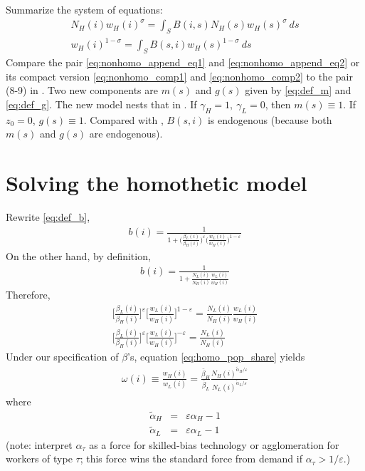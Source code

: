 \documentclass{article}
\begin{document}
Summarize the system of equations:
\begin{eqnarray}
    \label{eq:nonhomo_comp1}
	N_H(i) w_H(i)^{\sigma}  = \int_S B(i,s) N_H(s) w_H(s)^{\sigma}~ds \\
    \label{eq:nonhomo_comp2}
 	w_H(i)^{1-\sigma} = \int_S B(s,i) w_H(s)^{1-\sigma} ~ ds 
\end{eqnarray} 
Compare the pair \eqref{eq:nonhomo_append_eq1} and \eqref{eq:nonhomo_append_eq2} or its compact version \eqref{eq:nonhomo_comp1} and \eqref{eq:nonhomo_comp2} to the pair (8-9) in \citet{allen2014trade}. Two new components are $m(s)$ and $g(s)$ given by \eqref{eq:def_m} and \eqref{eq:def_g}. The new model nests that in \citet{allen2014trade}. If $\gamma_H=1,~\gamma_L=0$, then $m(s)\equiv 1$. If $z_0=0$, $g(s)\equiv 1$.  Compared with \citet{allen2014trade}, $B(s,i)$ is endogenous (because both $m(s)$ and $g(s)$ are endogenous). 

\section{Solving the homothetic model}

Rewrite \eqref{eq:def_b},
\begin{eqnarray}
	b(i) = \frac{1}{1 + \Big(\frac{\beta_L(i)}{\beta_H(i)}\Big)^{\varepsilon} \Big(\frac{w_L(i)}{w_H(i)}\Big)^{1-\varepsilon}} \nonumber
\end{eqnarray}
On the other hand, by definition,
\begin{eqnarray}
	b(i) = \frac{1}{1 + \frac{N_L(i)}{N_H(i)} \frac{w_L(i)}{w_H(i)}} \nonumber
\end{eqnarray}
Therefore,
\begin{eqnarray}
	\Big[\frac{\beta_L(i)}{\beta_H(i)}\Big]^{\varepsilon} \Big[\frac{w_L(i)}{w_H(i)}\Big]^{1-\varepsilon} = \frac{N_L(i)}{N_H(i)} \frac{w_L(i)}{w_H(i)} \nonumber \\
    \label{eq:homo_pop_share}
	\Big[\frac{\beta_L(i)}{\beta_H(i)}\Big]^{\varepsilon} \Big[\frac{w_L(i)}{w_H(i)}\Big]^{-\varepsilon}= \frac{N_L(i)}{N_H(i)} 
\end{eqnarray}
Under our specification of $\beta$'s, equation \eqref{eq:homo_pop_share} yields
\begin{eqnarray}
	\omega(i) \equiv \frac{w_H(i)}{w_L(i)} = \frac{\bar{\beta}_H}{\bar{\beta}_L} \frac{N_H(i)^{\tilde{\alpha}_H /\varepsilon}}{N_L(i)^{\tilde{\alpha}_L/\varepsilon}}
    \label{eq:homo_col_share}
\end{eqnarray}
where
\begin{eqnarray}
	\tilde{\alpha}_H & = & \varepsilon\alpha_H-1 \nonumber \\
	\tilde{\alpha}_L & = & \varepsilon\alpha_L-1 \nonumber
\end{eqnarray}
(note: interpret $\alpha_{\tau}$ as a force for skilled-bias technology or agglomeration for workers of type $\tau$; this force wins the standard force from demand if $\alpha_{\tau}>1/\varepsilon$.)
\end{document}
